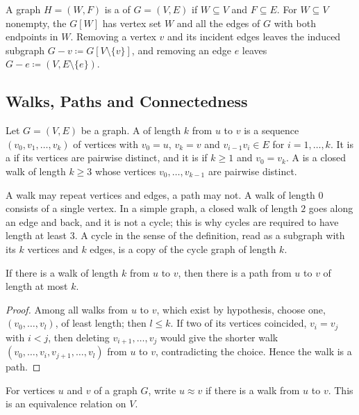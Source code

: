 A graph $H=(W,F)$ is a  of $G=(V,E)$ if $W\subseteq V$ and $F\subseteq E$. For $W\subseteq V$ nonempty, the  $G[W]$ has vertex set $W$ and all the edges of $G$ with both endpoints in $W$. Removing a vertex $v$ and its incident edges leaves the induced subgraph $G-v\coloneqq G[V\setminus\{v\}]$, and removing an edge $e$ leaves $G-e\coloneqq(V,E\setminus\{e\})$.

\subsection{Walks, Paths and Connectedness}

\begin{definition}
\label{def:walk}
Let $G=(V,E)$ be a graph. A  of length $k$ from $u$ to $v$ is a sequence $(v_0,v_1,\ldots,v_k)$ of vertices with $v_0=u$, $v_k=v$ and $v_{i-1}v_i\in E$ for $i=1,\ldots,k$. It is a  if its vertices are pairwise distinct, and it is  if $k\ge1$ and $v_0=v_k$. A  is a closed walk of length $k\ge3$ whose vertices $v_0,\ldots,v_{k-1}$ are pairwise distinct.
\end{definition}

A walk may repeat vertices and edges, a path may not. A walk of length $0$ consists of a single vertex. In a simple graph, a closed walk of length $2$ goes along an edge and back, and it is not a cycle; this is why cycles are required to have length at least $3$. A cycle in the sense of the definition, read as a subgraph with its $k$ vertices and $k$ edges, is a copy of the cycle graph of length $k$.

\begin{lemma}
\label{lem:walk-path}
If there is a walk of length $k$ from $u$ to $v$, then there is a path from $u$ to $v$ of length at most $k$.
\end{lemma}

\begin{proof}
Among all walks from $u$ to $v$, which exist by hypothesis, choose one, $(v_0,\ldots,v_l)$, of least length; then $l\le k$. If two of its vertices coincided, $v_i=v_j$ with $i<j$, then deleting $v_{i+1},\ldots,v_j$ would give the shorter walk $(v_0,\ldots,v_i,v_{j+1},\ldots,v_l)$ from $u$ to $v$, contradicting the choice. Hence the walk is a path.
\end{proof}

\begin{proposition}
\label{prop:components}
For vertices $u$ and $v$ of a graph $G$, write $u\approx v$ if there is a walk from $u$ to $v$. This is an equivalence relation on $V$.
\end{proposition}

